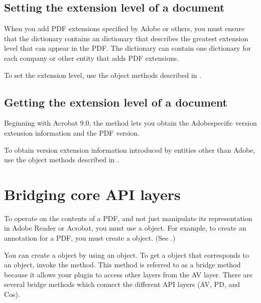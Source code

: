 \documentclass[letterpaper,12pt,english,openany,oneside]{sphinxmanual}
\begin{document}
\subsection{Setting the extension level of a document}
\label{\detokenize{Plugins_Documents:setting-the-extension-level-of-a-document}}
When you add PDF extensions specified by Adobe or others, you must ensure that the  dictionary contains an  dictionary that describes the greatest extension level that can appear in the PDF. The  dictionary can contain one dictionary for each company or other entity that adds PDF extensions.

To set the extension level, use the  object methods described in .


\subsection{Getting the extension level of a document}
\label{\detokenize{Plugins_Documents:getting-the-extension-level-of-a-document}}
Beginning with Acrobat 9.0, the  method lets you obtain the Adobe\sphinxhyphen{}specific version extension information and the PDF version.

To obtain version extension information introduced by entities other than Adobe, use the  object methods described in .


\section{Bridging core API layers}
\label{\detokenize{Plugins_Documents:bridging-core-api-layers}}
To operate on the contents of a PDF, and not just manipulate its representation in Adobe Reader or Acrobat, you must use a  object. For example, to create an annotation for a PDF, you must create a  object. (See .)

You can create a  object by using an  object. To get a  object that corresponds to an  object, invoke the  method. This method is referred to as a bridge method because it allows your plugin to access other layers from the AV layer. There are several bridge methods which connect the different API layers (AV, PD, and Cos).
\end{document}
